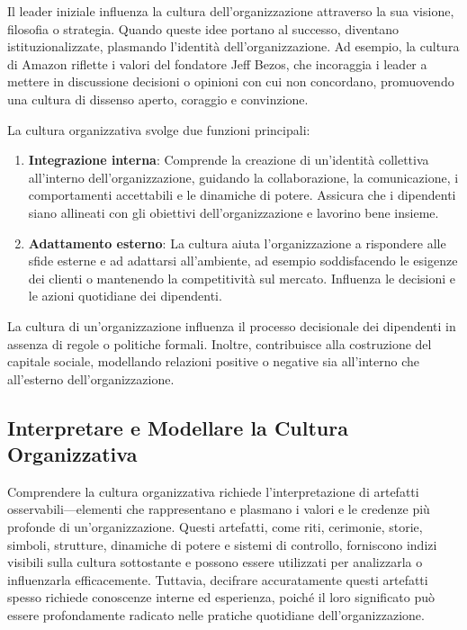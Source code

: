 \documentclass{article}
\begin{document}
Il leader iniziale influenza la cultura dell'organizzazione attraverso la sua visione, filosofia o strategia. Quando queste idee portano al successo, diventano istituzionalizzate, plasmando l'identità dell'organizzazione. Ad esempio, la cultura di Amazon riflette i valori del fondatore Jeff Bezos, che incoraggia i leader a mettere in discussione decisioni o opinioni con cui non concordano, promuovendo una cultura di dissenso aperto, coraggio e convinzione.

La cultura organizzativa svolge due funzioni principali:

\begin{enumerate}
  \item \textbf{Integrazione interna}: Comprende la creazione di un'identità collettiva all'interno dell'organizzazione, guidando la collaborazione, la comunicazione, i comportamenti accettabili e le dinamiche di potere. Assicura che i dipendenti siano allineati con gli obiettivi dell'organizzazione e lavorino bene insieme.
  
  \item \textbf{Adattamento esterno}: La cultura aiuta l'organizzazione a rispondere alle sfide esterne e ad adattarsi all'ambiente, ad esempio soddisfacendo le esigenze dei clienti o mantenendo la competitività sul mercato. Influenza le decisioni e le azioni quotidiane dei dipendenti.
\end{enumerate}

La cultura di un'organizzazione influenza il processo decisionale dei dipendenti in assenza di regole o politiche formali. Inoltre, contribuisce alla costruzione del capitale sociale, modellando relazioni positive o negative sia all'interno che all'esterno dell'organizzazione.

\subsection{Interpretare e Modellare la Cultura Organizzativa}

Comprendere la cultura organizzativa richiede l'interpretazione di artefatti osservabili—elementi che rappresentano e plasmano i valori e le credenze più profonde di un'organizzazione. Questi artefatti, come riti, cerimonie, storie, simboli, strutture, dinamiche di potere e sistemi di controllo, forniscono indizi visibili sulla cultura sottostante e possono essere utilizzati per analizzarla o influenzarla efficacemente. Tuttavia, decifrare accuratamente questi artefatti spesso richiede conoscenze interne ed esperienza, poiché il loro significato può essere profondamente radicato nelle pratiche quotidiane dell'organizzazione.
\end{document}

